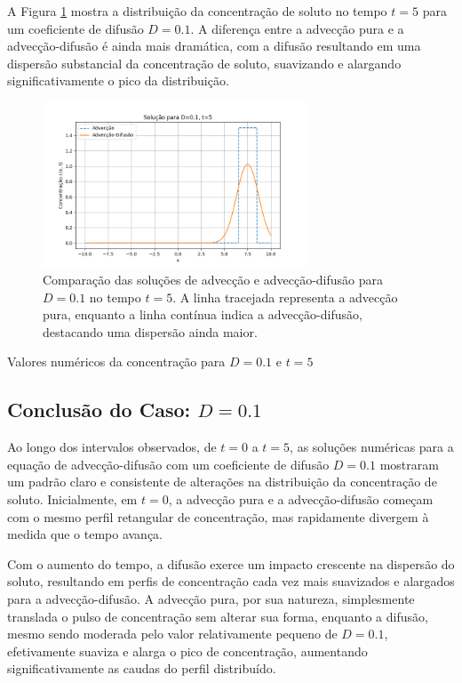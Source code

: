 A Figura \ref{fig:advec_diffus_0.1_t5} mostra a distribuição da concentração de soluto no tempo \( t = 5 \) para um coeficiente de difusão \( D = 0.1 \). A diferença entre a advecção pura e a advecção-difusão é ainda mais dramática, com a difusão resultando em uma dispersão substancial da concentração de soluto, suavizando e alargando significativamente o pico da distribuição.

\begin{figure}[H]
    \centering
    \includegraphics[width=0.7\textwidth]{code/plot/Advec_Difus_t5_D0.1.png}
    \caption{Comparação das soluções de advecção e advecção-difusão para \( D = 0.1 \) no tempo \( t = 5 \). A linha tracejada representa a advecção pura, enquanto a linha contínua indica a advecção-difusão, destacando uma dispersão ainda maior.}
    \label{fig:advec_diffus_0.1_t5}
\end{figure}

\begin{table}[H]
    \centering
    \caption{Valores numéricos da concentração para \( D = 0.1 \) e \( t = 5 \)}
    
\end{table}


\subsection{Conclusão do Caso: \( D = 0.1 \)}
Ao longo dos intervalos observados, de \( t = 0 \) a \( t = 5 \), as soluções numéricas para a equação de advecção-difusão com um coeficiente de difusão \( D = 0.1 \) mostraram um padrão claro e consistente de alterações na distribuição da concentração de soluto. Inicialmente, em \( t = 0 \), a advecção pura e a advecção-difusão começam com o mesmo perfil retangular de concentração, mas rapidamente divergem à medida que o tempo avança.

Com o aumento do tempo, a difusão exerce um impacto crescente na dispersão do soluto, resultando em perfis de concentração cada vez mais suavizados e alargados para a advecção-difusão. A advecção pura, por sua natureza, simplesmente translada o pulso de concentração sem alterar sua forma, enquanto a difusão, mesmo sendo moderada pelo valor relativamente pequeno de \( D = 0.1 \), efetivamente suaviza e alarga o pico de concentração, aumentando significativamente as caudas do perfil distribuído.


